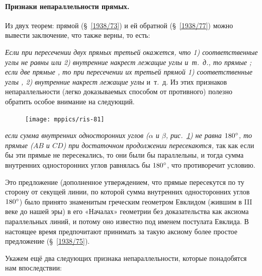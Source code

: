 \paragraph{Признаки непараллельности прямых.}\label{1938/78}
Из двух теорем:
прямой (§~\ref{1938/73}) и ей обратной (§~\ref{1938/77}) можно вывести заключение, что  также верны, то есть:

\emph{Если при пересечении двух прямых третьей окажется, что 1) соответственные углы не равны или 2) внутренние накрест лежащие углы  и~т.~д., то прямые ;
если две прямые , то при пересечении их третьей прямой 1) соответственные углы , 2) внутренние накрест лежащие углы } и~т.~д.
Из этих признаков непараллельности (легко доказываемых способом от противного) полезно обратить особое внимание на следующий.

\begin{figure}
\vskip-4mm
\centering
\texttt{[image: mppics/ris-81]}
\caption{}\label{1938/ris-81}
\end{figure}

\emph{если сумма внутренних односторонних углов \emph{($\alpha$ и $\beta$, рис.~\ref{1938/ris-81})} не равна $180\degree$, то прямые \emph{($AB$ и $CD$)} при достаточном продолжении пересекаются,} так как если бы эти прямые не пересекались, то они были бы параллельны, и тогда сумма внутренних односторонних углов равнялась бы $180\degree$, что противоречит условию.



Это предложение (дополненное утверждением, что прямые пересекутся по ту сторону от секущей линии, по которой сумма внутренних односторонних углов  $180\degree$) было принято знаменитым греческим геометром Евклидом (жившим в III веке до нашей эры) в его «Началах» геометрии без доказательства как аксиома параллельных линий, и потому оно известно под именем постулата Евклида.
В настоящее время предпочитают принимать за такую аксиому более простое предложение (§~\ref{1938/75}).

Укажем ещё два следующих признака непараллельности, которые понадобятся нам впоследствии:


